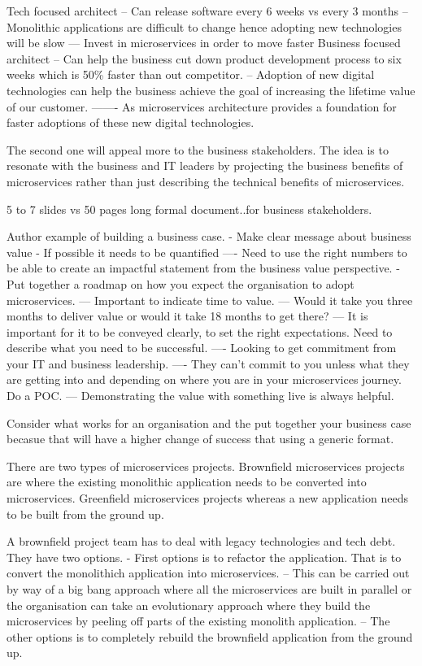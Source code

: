 \documentclass[a4paper, 11pt]{book}
\begin{document}
    Tech focused architect
    -- Can release software every 6 weeks vs every 3 months
    -- Monolithic applications are difficult to change hence adopting new technologies will be slow
    --- Invest in microservices in order to move faster
    Business focused architect
    -- Can help the business cut down product development process to six weeks which is 50\% faster than out competitor.
    -- Adoption of new digital technologies can help the business achieve the goal of increasing the lifetime value of our customer.
    ------- As microservices architecture provides a foundation for faster adoptions of these new digital technologies.

    The second one will appeal more to the business stakeholders.
    The idea is to resonate with the business and IT leaders by projecting the business benefits of microservices rather than just describing the technical benefits of microservices.

    5 to 7 slides vs 50 pages long formal document..for business stakeholders.

    Author example of building a business case.
    - Make clear message about business value
    - If possible it needs to be quantified
    ---- Need to use the right numbers to be able to create an impactful statement from the business value perspective.
    - Put together a roadmap on how you expect the organisation to adopt microservices.
    --- Important to indicate time to value.
    --- Would it take you three months to deliver value or would it take 18 months to get there?
    --- It is important for it to be conveyed clearly, to set the right expectations. Need to describe what you need to be successful.
    ---- Looking to get commitment from your IT and business leadership.
    ---- They can't commit to you unless what they are getting into and depending on where you are in your microservices journey. Do a POC.
    --- Demonstrating the value with something live is always helpful.

    Consider what works for an organisation and the put together your business case becasue that will have a higher change of success that using a generic format.


    There are two types of microservices projects.
    Brownfield microservices projects are where the existing monolithic application needs to be converted into microservices.
    Greenfield microservices projects whereas a new application needs to be built from the ground up.

    A brownfield project team has to deal with legacy technologies and tech debt. They have two options.
    - First options is to refactor the application. That is to convert the monolithich application into microservices.
    -- This can be carried out by way of a big bang approach where all the microservices are built in parallel or the organisation can take an evolutionary approach where they build the microservices by peeling off parts of the existing monolith application.
    -- The other options is to completely rebuild the brownfield application from the ground up.
\end{document}
